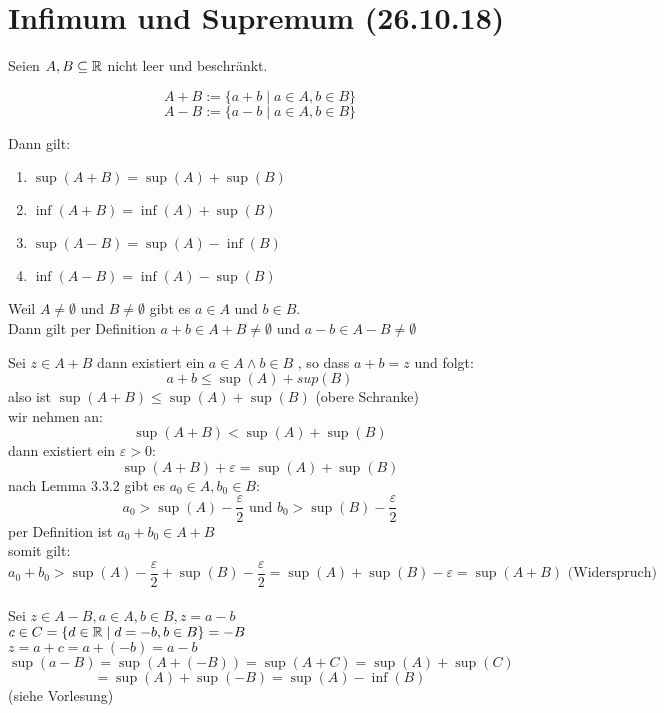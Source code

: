 \documentclass[../ana1u.tex]{subfiles}
\begin{document}
\setcounter{section}{1}

\section{Infimum und Supremum (26.10.18)}
\begin{satz}
    Seien \(A, B \subseteq \mathbb{R}\) nicht leer und beschränkt.
    \begin{defi}
        \[A + B := \{a + b \; | \; a \in A, b \in B\}\]
        \[A - B := \{a - b \; | \; a \in A, b \in B\}\]
    \end{defi}
    Dann gilt:
    \begin{enumerate}
        \item \(\sup(A + B) = \sup(A) + \sup(B)\)
        \item \(\inf(A + B) = \inf(A) + \sup(B)\)
        \item \(\sup(A - B) = \sup(A) - \inf(B)\)
        \item \(\inf(A - B) = \inf(A) - \sup(B)\)
    \end{enumerate}
    Weil \(A \neq \emptyset\) und \(B \neq \emptyset\) gibt es \(a \in A\) und \(b \in B\).\\
    Dann gilt per Definition \(a+b \in A+B \neq \emptyset\) und \(a-b \in A-B \neq \emptyset\)
\end{satz}
\begin{bew}
    Sei \(z \in A + B\) dann existiert ein \(a \in A \wedge b \in B\) , so dass \(a + b = z\) und folgt:
    \[a + b \leq \sup(A) + sup(B)\]	
    also ist \(\sup(A+B) \leq \sup(A) + \sup(B)\) (obere Schranke)\\
    wir nehmen an:
    \[\sup(A+B) < \sup(A) + \sup(B)\]
    dann existiert ein \(\varepsilon > 0\):
    \[\sup(A+B) + \varepsilon = \sup(A) + \sup(B)\]
    nach Lemma 3.3.2 gibt es \(a_0 \in A, b_0 \in B\):
    \[a_0 > \sup(A) - \frac{\varepsilon}{2} \text{ und } b_0 > \sup(B) - \frac{\varepsilon}{2}\]
    per Definition ist \(a_0 + b_0 \in A + B\)\\
    somit gilt:
    \[a_0 + b_0 > \sup(A) - \frac{\varepsilon}{2} + \sup(B) - \frac{\varepsilon}{2} = \sup(A) + \sup(B) - \varepsilon = \sup(A+B) \text{ (Widerspruch)}\]\\
    Sei \(z \in A - B, a \in A, b \in B, z = a - b\)\\
    \(c \in C = \{d \in \mathbb{R} \; | \; d = -b, b \in B\} = -B\)\\
    \(z = a + c = a + (-b) = a - b\) 
    \[\sup(a-B) = \sup(A + (-B)) = \sup(A + C) = \sup(A) + \sup(C)\]
    \[= \sup(A) + \sup(-B) = \sup(A) - \inf(B)\] (siehe Vorlesung)
\end{bew}
\end{document}
